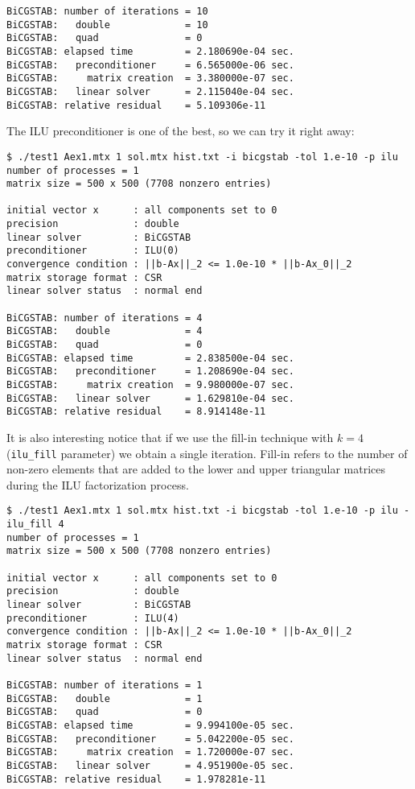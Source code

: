\begin{enumerate}[label=\textcolor{Green3}{\textbf{\arabic*.}}]
\begin{lstlisting}[mathescape=false]
BiCGSTAB: number of iterations = 10
BiCGSTAB:   double             = 10
BiCGSTAB:   quad               = 0
BiCGSTAB: elapsed time         = 2.180690e-04 sec.
BiCGSTAB:   preconditioner     = 6.565000e-06 sec.
BiCGSTAB:     matrix creation  = 3.380000e-07 sec.
BiCGSTAB:   linear solver      = 2.115040e-04 sec.
BiCGSTAB: relative residual    = 5.109306e-11\end{lstlisting}
    \newpage
    The ILU preconditioner is one of the best, so we can try it right away:
    \begin{lstlisting}[mathescape=false]
$ ./test1 Aex1.mtx 1 sol.mtx hist.txt -i bicgstab -tol 1.e-10 -p ilu
number of processes = 1
matrix size = 500 x 500 (7708 nonzero entries)

initial vector x      : all components set to 0
precision             : double
linear solver         : BiCGSTAB
preconditioner        : ILU(0)
convergence condition : ||b-Ax||_2 <= 1.0e-10 * ||b-Ax_0||_2
matrix storage format : CSR
linear solver status  : normal end

BiCGSTAB: number of iterations = 4
BiCGSTAB:   double             = 4
BiCGSTAB:   quad               = 0
BiCGSTAB: elapsed time         = 2.838500e-04 sec.
BiCGSTAB:   preconditioner     = 1.208690e-04 sec.
BiCGSTAB:     matrix creation  = 9.980000e-07 sec.
BiCGSTAB:   linear solver      = 1.629810e-04 sec.
BiCGSTAB: relative residual    = 8.914148e-11\end{lstlisting}
    It is also interesting notice that if we use the fill-in technique with $k = 4$ (\texttt{ilu\_fill} parameter) we obtain a single iteration. Fill-in refers to the number of non-zero elements that are added to the lower and upper triangular matrices during the ILU factorization process.
    \begin{lstlisting}[mathescape=false]
$ ./test1 Aex1.mtx 1 sol.mtx hist.txt -i bicgstab -tol 1.e-10 -p ilu -ilu_fill 4
number of processes = 1
matrix size = 500 x 500 (7708 nonzero entries)

initial vector x      : all components set to 0
precision             : double
linear solver         : BiCGSTAB
preconditioner        : ILU(4)
convergence condition : ||b-Ax||_2 <= 1.0e-10 * ||b-Ax_0||_2
matrix storage format : CSR
linear solver status  : normal end

BiCGSTAB: number of iterations = 1
BiCGSTAB:   double             = 1
BiCGSTAB:   quad               = 0
BiCGSTAB: elapsed time         = 9.994100e-05 sec.
BiCGSTAB:   preconditioner     = 5.042200e-05 sec.
BiCGSTAB:     matrix creation  = 1.720000e-07 sec.
BiCGSTAB:   linear solver      = 4.951900e-05 sec.
BiCGSTAB: relative residual    = 1.978281e-11\end{lstlisting}
\end{enumerate}


